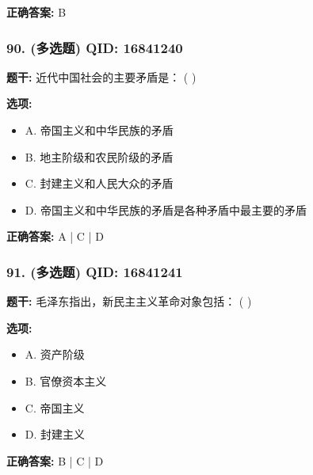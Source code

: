 \documentclass[12pt,UTF8]{ctexart}
\begin{document}
\textbf{正确答案:}
B

\vspace{0.3em}\hrulefill\vspace{0.7em}

\subsubsection*{90. (多选题) \small QID: 16841240}

\textbf{题干:}
近代中国社会的主要矛盾是： ( )

\textbf{选项:}
\begin{itemize}[leftmargin=*]

  \item A. 帝国主义和中华民族的矛盾

  \item B. 地主阶级和农民阶级的矛盾

  \item C. 封建主义和人民大众的矛盾

  \item D. 帝国主义和中华民族的矛盾是各种矛盾中最主要的矛盾

\end{itemize}

\textbf{正确答案:}
A | C | D

\vspace{0.3em}\hrulefill\vspace{0.7em}

\subsubsection*{91. (多选题) \small QID: 16841241}

\textbf{题干:}
毛泽东指出，新民主主义革命对象包括： ( )

\textbf{选项:}
\begin{itemize}[leftmargin=*]

  \item A. 资产阶级

  \item B. 官僚资本主义

  \item C. 帝国主义

  \item D. 封建主义

\end{itemize}

\textbf{正确答案:}
B | C | D

\vspace{0.3em}\hrulefill\vspace{0.7em}
\end{document}
